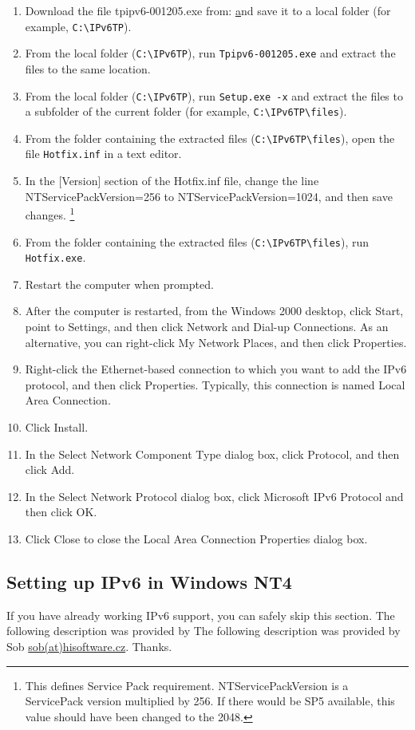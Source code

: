 \begin{enumerate}
  \item Download the file tpipv6-001205.exe from:
    \href{http://msdn.microsoft.com/downloads/sdks/platform/tpipv6.asp}
    and save it to a local folder (for example, \verb+C:\IPv6TP+).
  \item From the local folder (\verb+C:\IPv6TP+), run \verb+Tpipv6-001205.exe+ and extract the
    files to the same location.
  \item From the local folder (\verb+C:\IPv6TP+), run \verb+Setup.exe -x+ and extract the files to
    a subfolder of the current folder (for example, \verb+C:\IPv6TP\files+).
  \item From the folder containing the extracted files (\verb+C:\IPv6TP\files+), open the
    file \verb+Hotfix.inf+ in a text editor.
  \item In the [Version] section of the Hotfix.inf file, change the line
    NTServicePackVersion=256 to NTServicePackVersion=1024, and then
    save changes. \footnote{This defines Service Pack requirement.
      NTServicePackVersion is a ServicePack version multiplied by 256. If there
    would be SP5 available, this value should have been changed to the 2048.}
  \item From the folder containing the extracted files (\verb+C:\IPv6TP\files+), run
    \verb+Hotfix.exe+.
  \item Restart the computer when prompted.
  \item After the computer is restarted, from the Windows 2000 desktop, click Start,
    point to Settings, and then click Network and Dial-up Connections. As an
    alternative, you can right-click My Network Places, and then click Properties.
  \item Right-click the Ethernet-based connection to which you want to add the IPv6
    protocol, and then click Properties. Typically, this connection is named
    Local Area Connection.
  \item Click Install.
  \item In the Select Network Component Type dialog box, click Protocol, and then
    click Add.
  \item In the Select Network Protocol dialog box, click Microsoft IPv6 Protocol and
    then click OK.
  \item Click Close to close the Local Area Connection Properties
    dialog box.
\end{enumerate}

\subsection{Setting up IPv6 in Windows NT4}
If you have already working IPv6 support, you can safely skip this section.
The following description was provided by The following description was provided by Sob
\href{mailto:sob(at)hisoftware.cz}{sob(at)hisoftware.cz}. Thanks.


